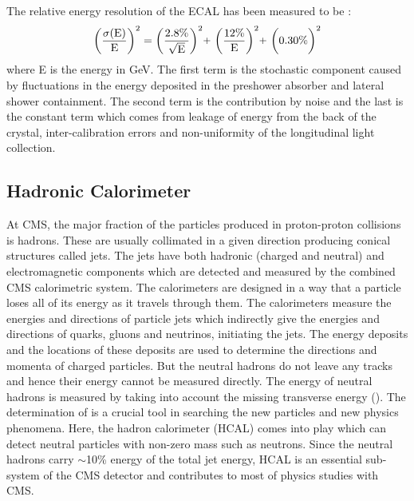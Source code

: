 The relative energy resolution of the ECAL has been measured to be \cite{Adzic:2007mi} :
\begin{equation}
{\rm \bigg(\frac{\sigma(E)}{E}\bigg)^2 = \bigg(\frac{2.8\%}{\sqrt{E}}\bigg)^2 \plus \bigg(\frac{12\%}{E}\bigg)^2 \plus \bigg(0.30\%\bigg)^2}
\end{equation}
where E is the energy in GeV. The first term is the stochastic component caused by fluctuations in the energy deposited in the preshower absorber and lateral shower containment. The second term is the contribution by noise and the last is the constant term which comes from leakage of energy from the back of the crystal, inter-calibration errors and non-uniformity of the longitudinal light collection. 

\subsection{Hadronic Calorimeter}
At CMS, the major fraction of the particles produced in proton-proton collisions is hadrons. These are usually collimated in a given direction producing conical structures called jets. The jets have both hadronic (charged and neutral) and electromagnetic components which are detected and measured by the combined CMS calorimetric system. The calorimeters are designed in a way that a particle loses all of its energy as it travels through them. The calorimeters measure the energies and directions of particle jets which indirectly give the energies and directions of quarks, gluons and neutrinos, initiating the jets. The energy deposits and the locations of these deposits are used to determine the directions and momenta of charged particles. But the neutral hadrons do not leave any tracks and hence their energy cannot be measured directly. The energy of neutral hadrons is measured by taking into account the missing transverse energy (\ETmiss). The determination of \ETmiss is a crucial tool in searching the new particles and new physics phenomena. Here, the hadron calorimeter (HCAL) comes into play which can detect neutral particles with non-zero mass such as neutrons. Since the neutral hadrons carry $\sim$10\% energy of the total jet energy, HCAL is an essential sub-system of the CMS detector and contributes to most of physics studies with CMS.

